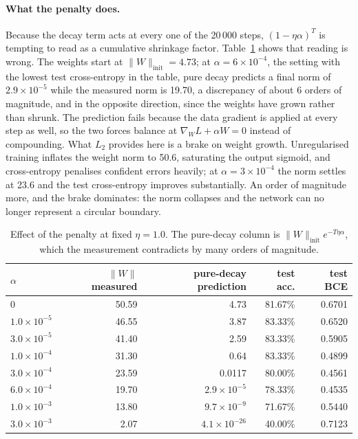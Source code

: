 \documentclass[11pt,a4paper]{article}
\begin{document}
\paragraph{What the penalty does.} Because the decay term acts at every one of the
20\,000 steps, $(1-\eta\alpha)^{T}$ is tempting to read as a cumulative shrinkage
factor. Table~\ref{tab:decay} shows that reading is wrong. The weights start at
$\lVert W\rVert_{\text{init}}=4.73$; at $\alpha=6\times 10^{-4}$, the
setting with the lowest test cross-entropy in the table, pure decay predicts a final
norm of $2.9\times 10^{-5}$ while the measured norm is 19.70, a
discrepancy of about 6 orders of magnitude, and in the opposite
direction, since
the weights have grown rather than shrunk. The prediction fails because the data
gradient is applied at every step as well, so the two forces balance at
$\nabla_W L+\alpha W=0$ instead of compounding. What $L_2$ provides here is a brake on
weight growth. Unregularised training inflates the weight norm to
50.6, saturating the output sigmoid, and cross-entropy
penalises confident errors heavily; at $\alpha=3\times10^{-4}$ the norm settles at
23.6 and the test cross-entropy improves substantially.
An order of magnitude more, and the brake dominates: the norm collapses and the
network can no longer represent a circular boundary.

\begin{table}[H]
\centering
\caption{Effect of the penalty at fixed $\eta=1.0$. The pure-decay column is $\lVert W\rVert_{\text{init}}e^{-T\eta\alpha}$, which the measurement contradicts by many orders of magnitude.}
\label{tab:decay}
\begin{tabular}{lrrrr}
\toprule
$\alpha$ & $\lVert W\rVert$ measured & pure-decay prediction & test acc. & test BCE \\
\midrule
0 & 50.59 & 4.73 & 81.67\% & 0.6701 \\
$1.0\times 10^{-5}$ & 46.55 & 3.87 & 83.33\% & 0.6520 \\
$3.0\times 10^{-5}$ & 41.40 & 2.59 & 83.33\% & 0.5905 \\
$1.0\times 10^{-4}$ & 31.30 & 0.64 & 83.33\% & 0.4899 \\
$3.0\times 10^{-4}$ & 23.59 & 0.0117 & 80.00\% & 0.4561 \\
$6.0\times 10^{-4}$ & 19.70 & $2.9\times 10^{-5}$ & 78.33\% & 0.4535 \\
$1.0\times 10^{-3}$ & 13.80 & $9.7\times 10^{-9}$ & 71.67\% & 0.5440 \\
$3.0\times 10^{-3}$ & 2.07 & $4.1\times 10^{-26}$ & 40.00\% & 0.7123 \\
\bottomrule
\end{tabular}
\end{table}
\end{document}
